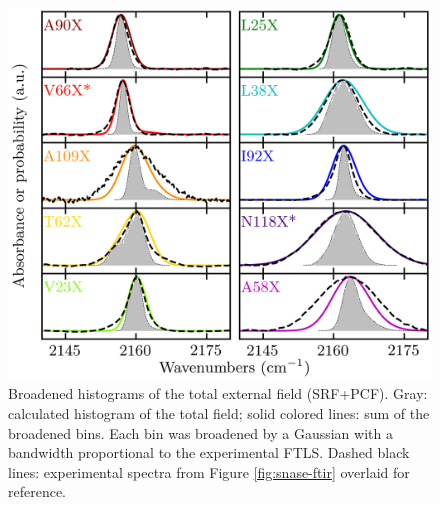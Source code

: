 \begin{figure}
    \center
    \includegraphics[width=\single]{figures-snase/convoluted_external_field.png}
    \caption[Broadened histograms of the total external field]{
        Broadened histograms of the total external field (SRF+PCF). 
        Gray: calculated histogram of the total field; 
        solid colored lines: sum of the broadened bins. 
        Each bin was broadened by a Gaussian with a bandwidth proportional to the experimental FTLS. 
        Dashed black lines: experimental spectra from Figure \ref{fig:snase-ftir} overlaid for reference.
    }
    \label{fig:snase-broadened}
\end{figure}

